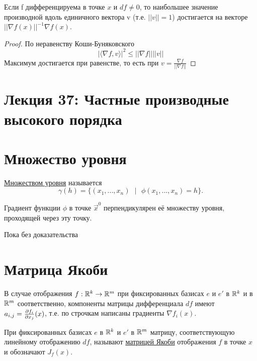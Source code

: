     \begin{lemma}
    	Если f дифференцируема в точке $x$ и $df \neq 0$, то наибольшее значение производной вдоль единичного вектора v (т.е. $||v|| = 1$) достигается на векторе $||\nabla f(x)||^{-1} \nabla f(x).$
    \end{lemma}
    
    \begin{proof}
    	По неравенству Коши-Буняковского
    	\[ |\langle \nabla f, v \rangle|^2 \leqslant ||\nabla f|| ||v|| \]
    	Максимум достигается при равенстве, то есть при $v = \frac{\nabla f}{||\nabla f||}$
    \end{proof}
    
    \newpage
    
    \section*{Лекция 37: Частные производные высокого порядка}
    
    \section{Множество уровня}
    
    \begin{definition}
    	\underline{Множеством уровня} называется
    	\[ \gamma(h) = \{(x_1, ..., x_n) \text{ } | \text{ } \phi(x_1, ..., x_n) = h\}. \]
    \end{definition}
    
    \begin{sentence}
    	Градиент функции $\phi$ в точке $\vec{x}^0$ перпендикулярен её множеству уровня, проходящей через эту точку.
    \end{sentence}
    
    Пока без доказательства
    
    \section{Матрица Якоби}
    
    \begin{mention}
    	В случае отображения $f : \mathbb R^k \rightarrow \mathbb R^m$ при фиксированных базисах $e$ и $e'$ в $\mathbb R^k$ и в $\mathbb R^m$ соответственно, компоненты матрицы дифференциала $df$ имеют $a_{i, j} = \frac{\partial f_i}{\partial x_j} (x)$, т.е. по строчкам написаны градиенты $\nabla f_i(x).$
    \end{mention}
    
    \begin{definition}
    	При фиксированных базисах $e$ в $\mathbb R^k$ и $e'$ в $\mathbb R^m$ матрицу, соответствующую линейному отображению $df$, называют \underline{матрицей Якоби} отображения $f$ в точке $x$ и обозначают $J_f (x)$.
    \end{definition}
    
